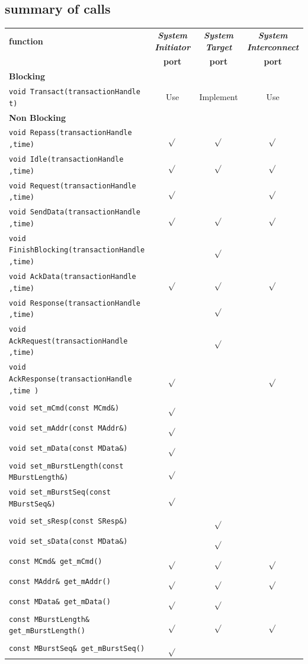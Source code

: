 \documentclass[12pt,oneside]{gsbook}
\newcommand{\master}{{\em System Initiator}\xspace}
\newcommand{\slave}{{\em System Target}\xspace}
\newcommand{\router}{{\em System Interconnect}\xspace}
\newcommand{\tick}{$\sqrt{}$}
\begin{document}
\subsection{summary of calls}

\begin{tabular}{|p{8cm}|c|c|c|}
\hline
{\bf function} & {\bf \master} & {\bf \slave}& {\bf \router} \\
 & {\bf port}  & {\bf port } & {\bf port }\\
\hline
\hline
{\bf Blocking}&&&\\
    {\tt void Transact(transactionHandle t)} & Use & Implement & Use\\
\hline
{\bf Non Blocking}&&&\\
    {\tt void Repass(transactionHandle ,time)}	& \tick & \tick & \tick \\
    {\tt void Idle(transactionHandle ,time)}		& \tick & \tick & \tick\\
    {\tt void Request(transactionHandle ,time)}	& \tick &	& \tick\\
    {\tt void SendData(transactionHandle ,time)}	& \tick & \tick & \tick\\
    {\tt void FinishBlocking(transactionHandle ,time)}& 	 & \tick &\\
    {\tt void AckData(transactionHandle ,time)}	& \tick & \tick & \tick\\
    {\tt void Response(transactionHandle ,time)}	& 	 & \tick &\\
    {\tt void AckRequest(transactionHandle ,time)}	& 	 & \tick &\\
    {\tt void AckResponse(transactionHandle ,time )} & \tick & 	& \tick\\
\hline

 {\tt void set\_mCmd(const MCmd\&) }			&\tick&&\\
 {\tt void set\_mAddr(const MAddr\&) }		&\tick&&\\
 {\tt void set\_mData(const MData\&) }			&\tick&&\\
 {\tt void set\_mBurstLength(const MBurstLength\&) }	&\tick&&\\
 {\tt void set\_mBurstSeq(const MBurstSeq\&) }		&\tick&&\\

 {\tt void set\_sResp(const SResp\&)} 			&	&\tick&\\
 {\tt void set\_sData(const MData\&)}			&	&\tick&\\

 {\tt const MCmd\& get\_mCmd()  }		&\tick&\tick&\tick\\
 {\tt const MAddr\& get\_mAddr()  }		&\tick&\tick&\tick\\
 {\tt const MData\& get\_mData()  }		&\tick&\tick&\\
 {\tt const MBurstLength\& get\_mBurstLength()  }	&\tick&\tick&\tick\\
 {\tt const MBurstSeq\& get\_mBurstSeq()  }	&\tick&&\\


\end{tabular}
\end{document}

